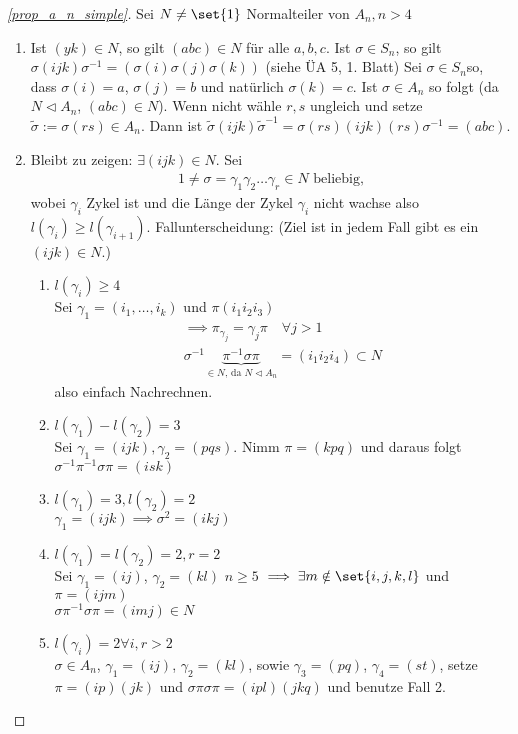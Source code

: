 \begin{proof}[\cref{prop_a_n_simple}]
	Sei $N \neq \set{1}$ Normalteiler von $A_n, n> 4$
	\begin{enumerate}
		\item Ist $(yk) \in N$, so gilt $(abc) \in N$ für alle $a,b,c$. Ist $\sigma \in S_n$, so gilt $\sigma(ijk)\sigma^{-1} = (\sigma(i)\sigma(j)\sigma(k))$ (siehe ÜA 5, 1. Blatt) Sei $\sigma \in S_n$so, dass $\sigma(i) = a$, $\sigma(j) = b$ und natürlich $\sigma(k) = c$. Ist $\sigma \in A_n$ so folgt (da $N \lhd A_n$, $(abc) \in N$). Wenn nicht wähle $r,s$ ungleich und setze $\tilde{\sigma}:= \sigma(rs) \in A_n$. %
		Dann ist $\tilde{\sigma}(ijk)\tilde{\sigma}^{-1} = \sigma(rs)(ijk)(rs)\sigma^{-1} = (abc)$.
		\item Bleibt zu zeigen: $\exists(ijk) \in N$. Sei
		\begin{align*}
			1 \neq \sigma=\gamma_1 \gamma_2 \dots \gamma_r \in N \text{ beliebig,}
		\end{align*} 
		wobei $\gamma_i$ Zykel ist und die Länge der Zykel $\gamma_i$ nicht wachse also $l(\gamma_i) \ge l(\gamma_{i+1})$. Fallunterscheidung: (Ziel ist in jedem Fall gibt es ein $(ijk) \in N$.)
		\begin{enumerate} %
			\item $l(\gamma_i) \ge 4$\\
				Sei $\gamma_1 = (i_1, \dots, i_k)$ und $\pi(i_1 i_2 i_3)$ 
				\begin{align*}
					\implies \pi_{\gamma_j} = \gamma_j \pi \quad \forall j > 1\\
					\sigma^{-1}\underbrace{\pi^{-1}\sigma \pi}_{\in N\text{, da } N \lhd A_n} = (i_1 i_2 i_4) \subset N
				\end{align*}
				also einfach Nachrechnen.
			\item $l(\gamma_1) - l(\gamma_2) = 3$\\
			Sei $\gamma_1=(ijk), \gamma_2 = (pqs)$. Nimm $\pi = (kpq)$ und daraus folgt $\sigma^{-1}\pi^{-1}\sigma\pi = (isk)$
			\item $l(\gamma_1) = 3, l(\gamma_2) = 2$\\
			$\gamma_1 = (ijk) \implies \sigma^{2} = (ikj)$
			\item $l(\gamma_1) = l(\gamma_2) = 2, r = 2$\\
			Sei $\gamma_1 = (ij)$, $\gamma_2 = (kl)$ $n \ge 5$ $\implies \exists m \notin \set{i,j,k,l}$ und $\pi = (ijm)$\\
			$\sigma \pi^{-1}\sigma\pi = (imj) \in N$
			\item $l(\gamma_i) = 2 \forall i, r > 2$\\
			$\sigma \in A_n$, $\gamma_1 =(ij)$, $\gamma_2 = (kl)$, sowie $\gamma_3 = (pq)$, $\gamma_4 = (st)$, setze $\pi = (ip)(jk)$ und $\sigma\pi \sigma \pi = (ipl)(jkq)$ und benutze Fall 2.
		\end{enumerate}
	\end{enumerate}
\end{proof}
